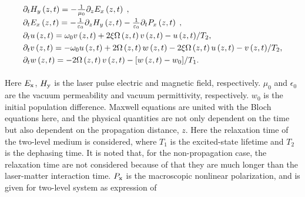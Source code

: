 \documentclass[10pt,letterpaper]{article}
\begin{document}
\begin{equation}
\begin{array}{l}
\smallskip
{\partial _t}{H_y}\left( {z,t} \right) =  - \frac{1}{{{\mu _0}}}{\partial _z}{E_x}\left( {z,t} \right)\;,\\
\smallskip
{\partial _t}{E_x}\left( {z,t} \right) =  - \frac{1}{{{\varepsilon _0}}}{\partial _z}{H_y}\left( {z,t} \right) - \frac{1}{{{\varepsilon _0}}}{\partial _t}{P_x}\left( {z,t} \right)\;,\\
\smallskip
{\partial _t}u\left( {z,t} \right) = {\omega _0}v\left( {z,t} \right) + 2\xi \Omega \left( {z,t} \right)v\left( {z,t} \right) - {{u\left( {z,t} \right)} \mathord{\left/
		{\vphantom {{u\left( {z,t} \right)} {{T_2}}}} \right.
		\kern-\nulldelimiterspace} {{T_2}}},\\
\smallskip
{\partial _t}v\left( {z,t} \right) =  - {\omega _0}u\left( {z,t} \right) + 2\Omega \left( {z,t} \right)w\left( {z,t} \right) - 2\xi \Omega \left( {z,t} \right)u\left( {z,t} \right) - {{v\left( {z,t} \right)} \mathord{\left/
		{\vphantom {{v\left( {z,t} \right)} {{T_2}}}} \right.
		\kern-\nulldelimiterspace} {{T_2}}},\\
\smallskip
{\partial _t}w\left( {z,t} \right) =  - 2\Omega \left( {z,t} \right)v\left( {z,t} \right) - {{\left[ {w\left( {z,t} \right) - {w_{0}}} \right]} \mathord{\left/
		{\vphantom {{\left[ {w\left( {z,t} \right) - {w_{0}}} \right]} {{T_1}}}} \right.
		\kern-\nulldelimiterspace} {{T_1}}}.
\end{array}
\label{eq10}
\end{equation}

Here $ E_{\rm{x}} $, $ H_{\rm{y}} $ is the laser pulse electric and magnetic field, respectively. $\mu_{0}$ and $ \epsilon_{0} $ are the vacuum permeability and vacuum permittivity, respectively. $w_0$ is the initial population difference. Maxwell equations are united with the Bloch equations here, and the physical quantities are not only dependent on the time but also dependent on the propagation distance, $ z $. Here the relaxation time of the two-level medium is considered, where $T_{1}$ is the excited-state lifetime and $T_{2}$ is the dephasing time. It is noted that, for the non-propagation case, the relaxation time are not considered because of that they are much longer than the laser-matter interaction time. $ P_{\rm{x}} $ is the macroscopic nonlinear polarization, and is given for two-level system as expression of \cite{Pan-Ruiqin-Permanent-dipole-moment-2011}
\end{document}
